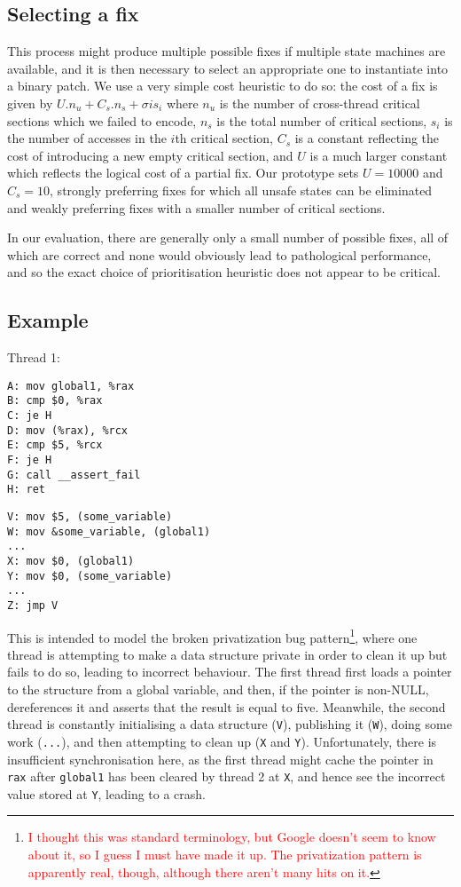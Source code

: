 \documentclass[10pt,twocolumn,preprint,natbib,authoryear]{sigplanconf}
\newcommand{\editorial}[1]{\textcolor{red}{\footnote{\textcolor{red}{#1}}}}
\begin{document}
\subsection{Selecting a fix}

This process might produce multiple possible fixes if multiple state
machines are available, and it is then necessary to select an
appropriate one to instantiate into a binary patch.  We use a very
simple cost heuristic to do so: the cost of a fix is given by $U.n_u +
C_s.n_s + {\sigma{}{i}}s_i$ where $n_u$ is the number of cross-thread
critical sections which we failed to encode, $n_s$ is the total number
of critical sections, $s_i$ is the number of accesses in the $i$th
critical section, $C_s$ is a constant reflecting the cost of
introducing a new empty critical section, and $U$ is a much larger
constant which reflects the logical cost of a partial fix.  Our
prototype sets $U=10000$ and $C_s=10$, strongly preferring fixes for
which all unsafe states can be eliminated and weakly preferring fixes
with a smaller number of critical sections.

In our evaluation, there are generally only a small number of possible
fixes, all of which are correct and none would obviously lead to
pathological performance, and so the exact choice of prioritisation
heuristic does not appear to be critical.

\subsection{Example}

Thread 1:

\begin{verbatim}
A: mov global1, %rax
B: cmp $0, %rax
C: je H
D: mov (%rax), %rcx
E: cmp $5, %rcx
F: je H
G: call __assert_fail
H: ret
\end{verbatim}

\begin{verbatim}
V: mov $5, (some_variable)
W: mov &some_variable, (global1)
...
X: mov $0, (global1)
Y: mov $0, (some_variable)
...
Z: jmp V
\end{verbatim}

This is intended to model the broken privatization bug
pattern\editorial{I thought this was standard terminology, but Google
  doesn't seem to know about it, so I guess I must have made it
  up. The privatization pattern is apparently real, though, although
  there aren't many hits on it.}, where one thread is attempting to
make a data structure private in order to clean it up but fails to do
so, leading to incorrect behaviour.  The first thread first loads a
pointer to the structure from a global variable, and then, if the
pointer is non-NULL, dereferences it and asserts that the result is
equal to five.  Meanwhile, the second thread is constantly
initialising a data structure (\verb|V|), publishing it (\verb|W|),
doing some work (\verb|...|), and then attempting to clean up
(\verb|X| and \verb|Y|).  Unfortunately, there is insufficient
synchronisation here, as the first thread might cache the pointer in
\verb|rax| after \verb|global1| has been cleared by thread 2 at
\verb|X|, and hence see the incorrect value stored at \verb|Y|,
leading to a crash.
\end{document}
